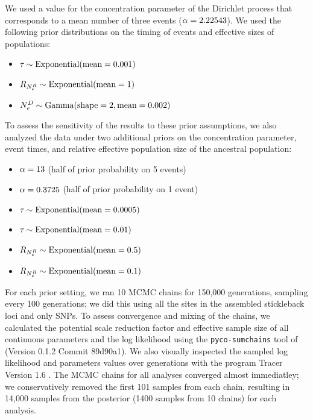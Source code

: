 We used a value for the concentration parameter of the Dirichlet process
that corresponds to a mean number of three events
($\concentration = 2.22543$).
We used the following prior distributions on the timing of events and effective
sizes of populations:
\begin{itemize}
    \item $\etime \sim \dexponential{0.001}$
    \item $\rootrelativepopsize \sim \dexponential{1}$
    \item $\epopsize[\descendantpopindex{}] \sim \dgamma{2}{0.002}$
\end{itemize}
To assess the sensitivity of the results to these prior assumptions,
we also analyzed the data under two additional priors on
the concentration parameter, event times, and relative
effective population size of the ancestral population:
\begin{itemize}
    \item $\concentration = 13$ (half of prior probability on 5 events)
    \item $\concentration = 0.3725$ (half of prior probability on 1 event)
    \item $\etime \sim \dexponential{0.0005}$
    \item $\etime \sim \dexponential{0.01}$
    \item $\rootrelativepopsize \sim \dexponential{0.5}$
    \item $\rootrelativepopsize \sim \dexponential{0.1}$
\end{itemize}

For each prior setting, we ran 10 MCMC chains for 150,000 generations, sampling
every 100 generations; we did this using all the sites in the assembled
stickleback loci and only SNPs.
To assess convergence and mixing of the chains, we calculated the potential
scale reduction factor \citep[PSRF; the square root of Equation 1.1 in][]{Brooks1998}
and effective sample size \citep{Gong2014} of all continuous parameters and the
log likelihood using the \texttt{pyco-sumchains} tool of \pycoevolity
(Version 0.1.2 Commit 89d90a1).
We also visually inspected the sampled log likelihood and parameters values
over generations with the program Tracer Version 1.6 \citep{Tracer16}.
The MCMC chains for all analyses converged almost immediatley; we
conservatively removed the first 101 samples from each chain, resulting in
14,000 samples from the posterior (1400 samples from 10 chains) for each
analysis.
